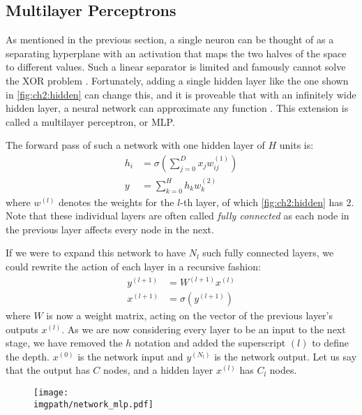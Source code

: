 \subsection{Multilayer Perceptrons}
As mentioned in the previous section, a single neuron can be thought of as a
separating hyperplane with an activation that maps the two halves of the space
to different values. Such a linear separator is limited and famously cannot
solve the XOR problem \cite{minsky_perceptrons:_1988}. Fortunately, adding a
single hidden layer like the one shown in \autoref{fig:ch2:hidden} can change
this, and it is proveable that with an infinitely wide hidden layer, a neural
network can approximate any function \cite{hornik_multilayer_1989,
cybenko_approximation_1989}. This extension is called a multilayer perceptron,
or MLP.

The forward pass of such a network with one hidden layer of $H$ units is:
%
\begin{align}
  h_i & =  \sigma\left(\sum_{j=0}^{D} x_j w_{ij}^{(1)}\right) \\
  y & =  \sum_{k=0}^{H} h_k w^{(2)}_{k}
\end{align}
%
where $w^{(l)}$ denotes the weights for the $l$-th layer, of which
\autoref{fig:ch2:hidden} has 2. Note that these individual layers are often
called \emph{fully connected} as each node in the previous layer affects every
node in the next.

If we were to expand this network to have $N_l$ such fully connected layers, we
could rewrite the action of each layer in a recursive fashion:
%
\begin{align}
  y^{(l+1)} &= W^{(l+1)}x^{(l)}  \label{eq:ch2:fc1}\\
  x^{(l+1)} &= \sigma\left(y^{(l+1)}\right) \label{eq:ch2:fc2}
\end{align}
where $W$ is now a weight matrix, acting on the vector of the previous layer's
outputs $x^{(l)}$. As we are now considering every layer to be an input to the next
stage, we have removed the $h$ notation and added the superscript $(l)$ to
define the depth. $x^{(0)}$ is the network input and $y^{(N_l)}$ is the network
output. Let us say that the output has $C$ nodes, and a hidden layer $x^{(l)}$
has $C_l$ nodes.

\begin{figure}[t]
  \centering
  \texttt{[image: \\imgpath/network\_mlp.pdf]}
  \label{fig:ch2:hidden}
\end{figure}


